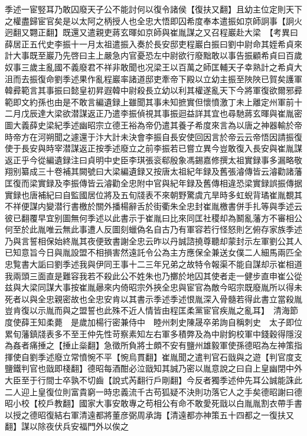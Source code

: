 季述一宦竪耳乃敢囚廢天子公不能討何以復令諸侯【復扶又翻】且幼主位定則天下之權盡歸宦官矣是以太阿之柄授人也全忠大悟即囚希度奉本遣振如京師詗事【詗火迥翻又翾正翻】既還又遣親吏蔣玄暉如京師與崔胤謀之又召程巖赴大梁　【考異曰薛居正五代史李振十一月太祖遣振入奏於長安邸吏程巖白振曰劉中尉命其姪希貞來計大事既至巖乃先啓曰主上嚴急内官憂恐左中尉欲行廢黜敢以事告振顧希貞曰百歲奴事三歲主亂國不義廢君不祥非敢聞也况梁王以百萬之師匡輔天子幸熟計之希貞大沮而去振復命劉季述果作亂程巖率諸道邸吏牽帝下殿以立幼主振至陜陜已賀矣護軍韓彛範言其事振曰懿皇初昇遐韓中尉殺長立幼以利其權遂亂天下今將軍復欲爾邪彛範即文約孫也由是不敢言編遺録上雖聞其事未知摭實但懷憤激丁未上離定州軍前十二月戊辰達大梁欲潜謀返正乃遣李振偵視其事振迴益詳其宜也尋馳蔣玄暉與崔胤密圖大義薛史梁紀季述幽昭宗立德王裕為帝仍遣其養子希度來言為以唐之神器輸於帝時帝方在河朔聞之遽還于汴大計未決會李振自長安使回因言於帝云云帝悟因請振復使于長安與時宰潜謀返正按季述廢立之前李振若已嘗立異今豈敢復入長安與崔胤謀返正乎今從編遺録注曰貞明中史臣李琪張衮郗殷象馮錫嘉修撰太祖實録事多漏略敬翔别纂成三十卷補其闕號曰大梁編遺録又按唐太祖紀年録及舊張濬傳皆云濬勸諸藩匡復而梁實録及李振傳皆云濬勸全忠附中官與紀年録及舊傳相違恐梁實録誤振傳据實録也唐補紀曰自監國居位將及五旬牋表不來朝野驚虞亢旱時多虹蜺背璚崔胤覩其不祥便謀内變潜行書檄於關外播楊辭舌於街衢朱全忠封崔胤檄書併手扎等與季述云彼已翻覆早宜别圖無何季述以此書示于崔胤曰比來同匡社稷却為鬭亂藩方不審相公何至於此胤唯云無此事遭人反圖刻蠟偽名自古乃有軍容若行怪怒則乞俯存家族季述乃與言誓相保始終胤其夜便致書謝全忠云昨以丹誠諮撓尊聽却蒙封示左軍劉公其人已知意旨今日與胤設盟不相損害然遠託令公為主方應保全兼送女僕二人細馬兩匹全忠覧書大詬曰劉季述我與伊同王事十二三年兄弟之故特令報渠不能自謀却示崔相道我兩頭三面直是難容我若不殺此公不姓朱也乃擲於地囚其使者走一健步直申崔公從兹與大梁同謀大事按崔胤曏來内倚昭宗外挾全忠與宦官為敵今昭宗既廢胤所以得未死者以與全忠親密故也全忠安肯以其書示季述季述恨胤深入骨髓若得此書立當殺胤豈肯復以示胤而與之盟誓也此殊不近人情皆由程匡柔黨宦官疾胤之亂耳】　清海節度使薛王知柔薨　是歲加楊行密兼侍中　睦州刺史陳晟卒弟詢自稱刺史　太子即位累旬藩鎮牋表多不至王仲先性苛察素知左右軍多積弊及為中尉鉤校軍中錢穀得隱沒為姦者痛捶之【捶止橤翻】急徵所負將士頗不安有鹽州雄毅軍使孫德昭為左神策指揮使自劉季述廢立常憤惋不平【惋烏貫翻】崔胤聞之遣判官石戩與之遊【判官度支鹽鐵判官也戩即棧翻】德昭每酒酣必泣戩知其誠乃密以胤意說之曰自上皇幽閉中外大臣至于行間士卒孰不切齒【說式芮翻行戶剛翻】今反者獨季述仲先耳公誠能誅此二人迎上皇復位則富貴窮一時忠義流千古苟狐疑不決則功落它人之手矣德昭謝曰德昭小校【校戶教翻】國家大事安敢專之苟相公有命不敢愛死戩以白胤胤割衣帶手書以授之德昭復結右軍清遠都將董彦弼周承誨【清遠都亦神策五十四都之一復扶又翻】謀以除夜伏兵安福門外以俟之

